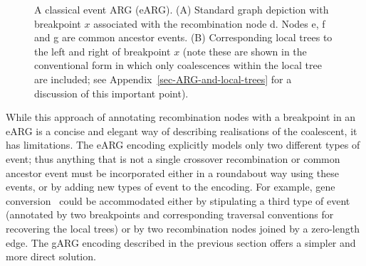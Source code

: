 \documentclass[9pt,twocolumn,twoside]{gsajnl}
\newcommand{\noderef}[1]{\textsf{#1}}
\begin{document}
\begin{figure}
\caption{\label{fig-event-arg}
A classical event ARG (eARG). (A) Standard graph depiction with
breakpoint $x$ associated with the recombination node \noderef{d}.
Nodes \noderef{e}, \noderef{f} and \noderef{g} are common ancestor events.
(B) Corresponding local trees to the left and right of breakpoint $x$
(note these are shown in the conventional form in which only coalescences
within the local tree are included; see Appendix~\ref{sec-ARG-and-local-trees}
for a discussion of this important point).
}
\end{figure}

While this approach of annotating recombination nodes with a
breakpoint in an eARG is a concise and elegant way of describing realisations
of the coalescent, it has limitations.
The eARG encoding explicitly models only
two different types of event; thus anything that is not a single crossover
recombination or common ancestor event must be incorporated
either in a roundabout way using these
events, or by adding new types of event to the encoding. For example, gene
conversion~\citep{wiuf2000coalescent} could 
be accommodated either by stipulating a third type of event
(annotated by two breakpoints and corresponding traversal conventions for
recovering the local trees) or by two recombination nodes joined by a
zero-length edge. The gARG encoding described in the previous
section offers a simpler and more direct solution.
\end{document}
